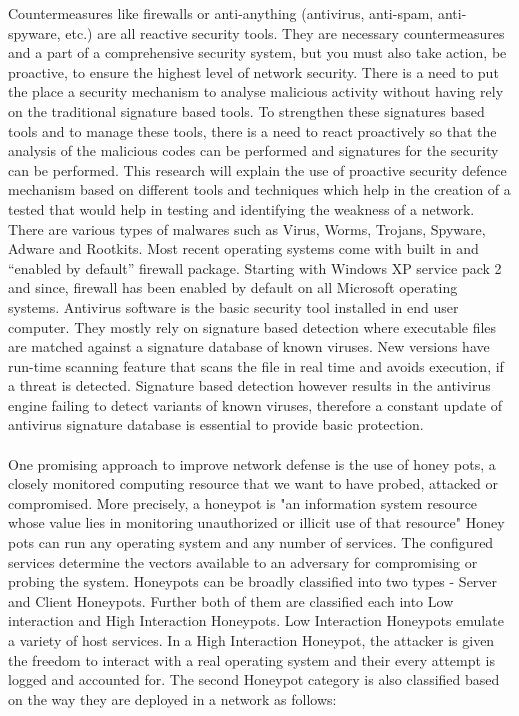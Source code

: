 \documentclass[11pt]{article}
\begin{document}
	Countermeasures like firewalls or anti-anything (antivirus, anti-spam, anti-spyware, etc.) are all reactive security tools. They are necessary countermeasures and a part of a comprehensive security system, but you must also take action, be proactive, to ensure the highest level of network security. There is a need to put the place a security mechanism to analyse malicious activity without having rely on the traditional signature based tools. To strengthen these signatures based tools and to manage these tools, there is a need to react proactively so that the analysis of the malicious codes can be performed and signatures for the security can be performed. This research will explain the use of proactive security defence mechanism based on different tools and techniques which help in the creation of a tested that would help in testing and identifying the weakness of a network. There are various types of malwares such as Virus, Worms, Trojans, Spyware, Adware and Rootkits. Most recent operating systems come with built in and “enabled by default” firewall package. Starting with Windows XP service pack 2 and since, firewall has been enabled by default on all Microsoft operating systems. Antivirus software is the basic security tool installed in end user computer. They mostly rely on signature based detection where executable files are matched against a signature database of known viruses. New versions have run-time scanning feature that scans the file in real time and avoids execution, if a threat is detected. Signature based detection however results in the antivirus engine failing to detect variants of known viruses, therefore a constant update of antivirus signature database is essential to provide basic protection.\\ \\
	One promising approach to improve network defense is the use of honey pots, a closely monitored computing resource that we want to have probed, attacked or compromised. More precisely, a honeypot is "an information system resource whose value lies in monitoring unauthorized or illicit use of that resource" Honey pots can run any operating system and any number of services. The configured services determine the vectors available to an adversary for compromising or probing the system. Honeypots can be broadly classified into two types - Server and Client Honeypots. Further both of them are classified each into Low interaction and High Interaction Honeypots. Low Interaction Honeypots emulate a variety of host services. In a High Interaction Honeypot, the attacker is given the freedom to interact with a real operating system and their every attempt is logged and accounted for. The second Honeypot category is also classified based on the way they are deployed in a network as follows:
\end{document}
